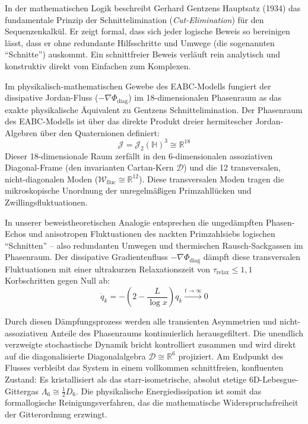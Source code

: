 \documentclass[11pt,a4paper]{article}
\numberwithin{equation}{section}
\begin{document}
	In der mathematischen Logik beschreibt Gerhard Gentzens Hauptsatz (1934) das fundamentale Prinzip der Schnittelimination (\textit{Cut-Elimination}) für den Sequenzenkalkül. Er zeigt formal, dass sich jeder logische Beweis so bereinigen lässt, dass er ohne redundante Hilfsschritte und Umwege (die sogenannten ``Schnitte'') auskommt. Ein schnittfreier Beweis verläuft rein analytisch und konstruktiv direkt vom Einfachen zum Komplexen.
	
	Im physikalisch-mathematischen Gewebe des EABC-Modells fungiert der dissipative Jordan-Fluss ($-\nabla \Phi_{\text{diag}}$) im 18-dimensionalen Phasenraum as das exakte physikalische Äquivalent zu Gentzens Schnittelimination. Der Phasenraum des EABC-Modells ist über das direkte Produkt dreier hermitescher Jordan-Algebren über den Quaternionen definiert:
	\begin{equation}
		\mathcal{J} = \mathcal{J}_2(\mathbb{H})^3 \cong \mathbb{R}^{18}
	\end{equation}
	Dieser 18-dimensionale Raum zerfällt in den 6-dimensionalen assoziativen Diagonal-Frame (den invarianten Cartan-Kern $\mathcal{D}$) und die 12 transversalen, nicht-diagonalen Moden ($\mathcal{W}_{\text{fluc}} \cong \mathbb{R}^{12}$). Diese transversalen Moden tragen die mikroskopische Unordnung der unregelmäßigen Primzahllücken und Zwillingsfluktuationen.
	
	In unserer beweistheoretischen Analogie entsprechen die ungedämpften Phasen-Echos und anisotropen Fluktuationen des nackten Primzahlsiebs logischen ``Schnitten'' – also redundanten Umwegen und thermischen Rausch-Sackgassen im Phasenraum. Der dissipative Gradientenfluss $-\nabla\Phi_{\text{diag}}$ dämpft diese transversalen Fluktuationen mit einer ultrakurzen Relaxationszeit von $\tau_{\text{relax}} \le 1{,}1$ Korbschritten gegen Null ab:
	\begin{equation}
		\dot{q}_k = -\left(2 - \frac{L}{\log x}\right) q_k \xrightarrow{t \to \infty} 0
	\end{equation}
	
	Durch diesen Dämpfungsprozess werden alle transienten Asymmetrien und nicht-assoziativen Anteile des Phasenraums kontinuierlich herausgefiltert. Die unendlich verzweigte stochastische Dynamik bricht kontrolliert zusammen und wird direkt auf die diagonalisierte Diagonalalgebra $\mathcal{D} \cong \mathbb{R}^6$ projiziert. Am Endpunkt des Flusses verbleibt das System in einem vollkommen schnittfreien, konfluenten Zustand: Es kristallisiert als das starr-isometrische, absolut stetige 6D-Lebesgue-Gittergas $\Lambda_6 \cong \frac{1}{2} D_6$. Die physikalische Energiedissipation ist somit das formallogische Reinigungsverfahren, das die mathematische Widerspruchsfreiheit der Gitterordnung erzwingt.
	
\end{document}
